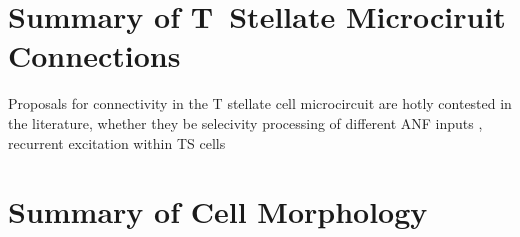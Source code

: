 \documentclass[10pt,a4paper,twoside,openright]{book}
\begin{document}




\section{Summary of T~Stellate Microciruit Connections}

Proposals for connectivity in the T stellate cell microcircuit are hotly contested in the literature, whether they be selecivity processing of different ANF inputs \citep{LaiWinslowEtAl:1994,LaiWinslowEtAl:1994a}, recurrent excitation within TS cells \citep{FerragamoGoldingEtAl:1998a,BahmerLangner:2006,WiegrebeMeddis:2004}

\begin{landscape}
{\small{}}  
\end{landscape}



\section{Summary of Cell Morphology}

\begin{landscape}
{\small{}}  
\end{landscape}
\end{document}
